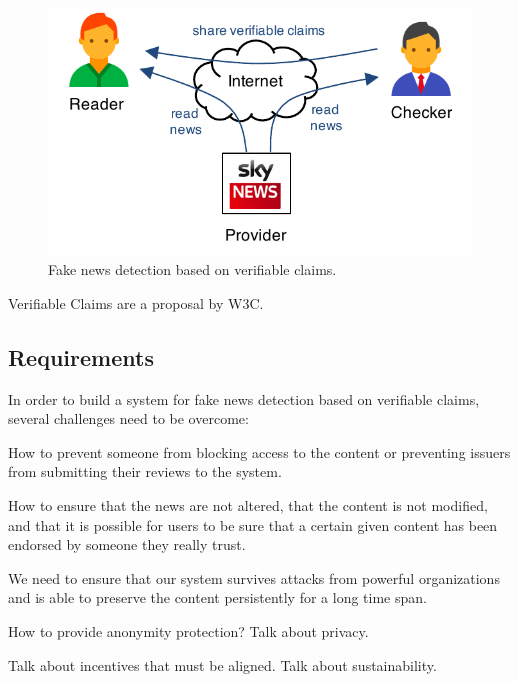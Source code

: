 
\begin{figure}[t]
  \centering
  \includegraphics[width=0.9\columnwidth]{figures/model.pdf}
  \vspace{-10pt}
  \caption{Fake news detection based on verifiable claims.}
  \label{fig:model}
\end{figure}

Verifiable Claims are a proposal by W3C. 


\subsection{Requirements}

In order to build a system for fake news detection based on verifiable claims, several challenges need to be overcome:

 How to prevent someone from blocking access to the content or preventing issuers from submitting their reviews to the system.

 How to ensure that the news are not altered, that the content is not modified, and that it is possible for users to be sure that a certain given content has been endorsed by someone they really trust.

 We need to ensure that our system survives attacks from powerful organizations and is able to preserve the content persistently for a long time span.

 How to provide anonymity protection? Talk about privacy. 

 Talk about incentives that must be aligned. Talk about sustainability.
